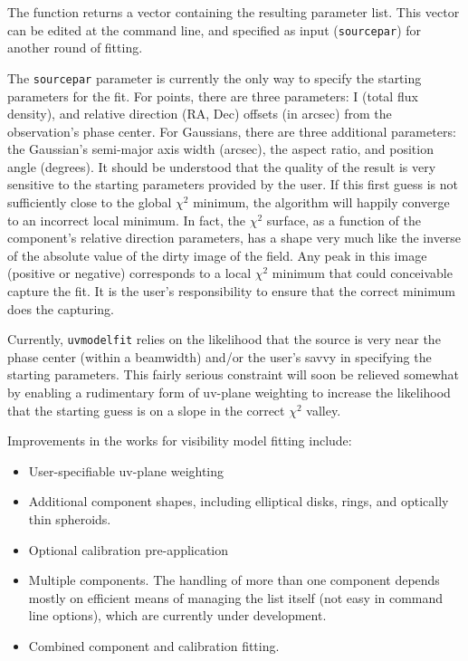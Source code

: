 {The function returns a vector containing the resulting parameter list.
This vector can be edited at the command line, and specified as input
({\tt sourcepar}) for another round of fitting.

The {\tt sourcepar} parameter is currently the only way to specify the
starting parameters for the fit.  For points, there are three
parameters: I (total flux density), and relative direction (RA, Dec)
offsets (in arcsec) from the observation's phase center.  For
Gaussians, there are three additional parameters: the Gaussian's
semi-major axis width (arcsec), the aspect ratio, and position angle
(degrees).  It should be understood that the quality of the result is
very sensitive to the starting parameters provided by the user.  If
this first guess is not sufficiently close to the global $\chi^2$
minimum, the algorithm will happily converge to an incorrect local
minimum.  In fact, the $\chi^2$ surface, as a function of the
component's relative direction parameters, has a shape very much like
the inverse of the absolute value of the dirty image of the field.
Any peak in this image (positive or negative) corresponds to a local
$\chi^2$ minimum that could conceivable capture the fit.  It is the
user's responsibility to ensure that the correct minimum does the
capturing.

Currently, {\tt uvmodelfit} relies on the likelihood that the source
is very near the phase center (within a beamwidth) and/or the user's
savvy in specifying the starting parameters.  This fairly serious
constraint will soon be relieved somewhat by enabling a rudimentary
form of uv-plane weighting to increase the likelihood that the
starting guess is on a slope in the correct $\chi^2$ valley.

Improvements in the works for visibility model fitting include:

\begin{itemize}
   \item User-specifiable uv-plane weighting
   \item Additional component shapes, including elliptical disks, rings,
         and optically thin spheroids.
   \item Optional calibration pre-application
   \item Multiple components.  The handling of more than one component
         depends mostly on efficient means of managing the list itself (not easy in
         command line options), which are currently under development.
   \item Combined component and calibration fitting.
\end{itemize}

}
